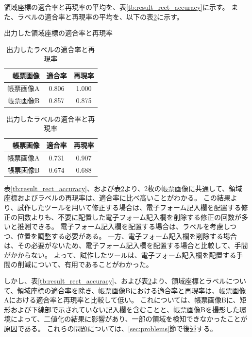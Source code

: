 領域座標の適合率と再現率の平均を、表\ref{tb:result_rect_accuracy}に示す。
また、ラベルの適合率と再現率の平均を、以下の表\ref{tb:result_label_accuracy}に示す。

\begin{table}[t]
    \centering
    \begin{minipage}[h]{0.47\linewidth}
        \caption{出力した領域座標の適合率と再現率}
        \label{tb:result_rect_accuracy}
        \centering
        \begin{tabular}{r|c|c}
            帳票画像 & 適合率 & 再現率 \\
            \hline \hline
            帳票画像A & 0.806 & 1.000 \\
            帳票画像B & 0.857 & 0.875 \\
        \end{tabular}
    \end{minipage}
    \begin{minipage}[h]{0.47\linewidth}
        \caption{出力したラベルの適合率と再現率}
        \label{tb:result_label_accuracy}
        \centering
        \begin{tabular}{r|c|c}
            帳票画像 & 適合率 & 再現率 \\
            \hline \hline
            帳票画像A & 0.731 & 0.907 \\
            帳票画像B & 0.674 & 0.688 \\
        \end{tabular}
    \end{minipage}
\end{table}

表\ref{tb:result_rect_accuracy}、および表\ref{tb:result_label_accuracy}より、2枚の帳票画像に共通して、領域座標およびラベルの再現率は、適合率に比べ高いことがわかる。
この結果より、試作したツールを用いて修正する場合は、電子フォーム記入欄を配置する修正の回数よりも、不要に配置した電子フォーム記入欄を削除する修正の回数が多いと推測できる。
電子フォーム記入欄を配置する場合は、ラベルを考慮しつつ、位置を調整する必要がある。
一方、電子フォーム記入欄を削除する場合は、その必要がないため、電子フォーム記入欄を配置する場合と比較して、手間がかからない。
よって、試作したツールは、電子フォーム記入欄を配置する手間の削減について、有用であることがわかった。

しかし、表\ref{tb:result_rect_accuracy}、および表\ref{tb:result_label_accuracy}より、領域座標とラベルについて、領域座標の適合率を除き、帳票画像Bにおける適合率と再現率は、帳票画像Aにおける適合率と再現率と比較して低い。
これについては、帳票画像Bに、矩形および下線部で示されていない記入欄を含むことと、帳票画像Bを撮影した環境によって、二値化の結果に影響があり、一部の領域を検知できなかったことが原因である。
これらの問題については、\ref{sec:problems}節で後述する。

